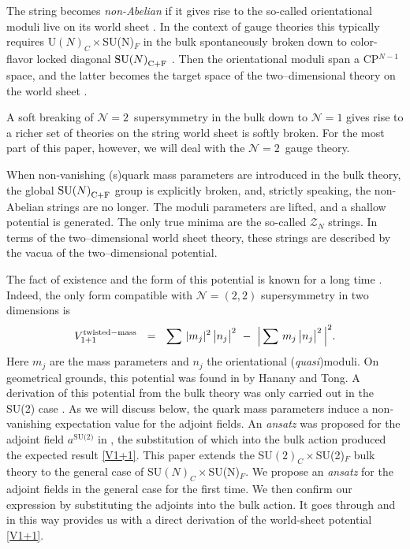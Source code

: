 \documentclass[12pt]{article}
\def\beq{\begin{equation}}
\def\eeq{\end{equation}}
\newcommand{\ntwon}{${\mathcal N}=2$}
\newcommand{\ntwot}{${\mathcal N}= \left(2,2\right) $ }
\newcommand{\mc}[1]{\mathcal{#1}}
\def\cfl {$\text{SU($N$)}_{\rm C+F}$ }
\newcommand{\cpn}{CP$^{N-1}$\,}
\newcommand{\ansatz}{{\it ansatz} }
\begin{document}
	The string becomes {\it non-Abelian} if it gives rise to the so-called orientational moduli 	live on
	its world sheet \cite{HT1,ABEKY,SYmon,HT2}. In the context of gauge theories this typically requires U$(N)_C\times$SU(N)$_F$
	in the bulk
	spontaneously broken down to color-flavor locked  diagonal $\!$\cfl.
	Then the orientational moduli  span a \cpn space, and 
	the latter becomes the target space of the two--dimensional theory on the world sheet \cite{SYrev}.

	A soft breaking of   \ntwon\, supersymmetry in the bulk down to
	${\mathcal N}=1$ gives rise to a richer  set of theories on the string world sheet
	is softly broken.
	For the most part of this paper, however, we will deal with the \ntwon\, gauge theory.

	When non-vanishing (s)quark mass parameters are introduced in  the bulk theory, 
	the global \cfl group is explicitly broken, and, strictly speaking,
	the non-Abelian strings are no longer.
	The moduli parameters are lifted, and a shallow potential is generated. The only true minima  are the so-called $ \mc{Z}_N $ strings.
	In terms of the two--dimensional world sheet theory, these strings are described by
	the vacua of the two--dimensional potential.

	The fact of existence and the form of this potential is known for a long time 
\cite{HT2,Shifman:2006bs}.
	Indeed, the only form compatible with \ntwot supersymmetry in two dimensions is
\beq
\label{V1+1}
	V_{1+1}^{\rm twisted-mass}    ~~=~~    \sum\, | m_j |^2\, \big| n_j \big|^2   ~-~  \Big| \sum\, m_j\, \big| n_j \big|^2 \,\Big|^2.
\eeq
	Here $ m_j $ are the mass parameters and $ n_j $ the orientational ({\it quasi})moduli.
	On geometrical grounds, this potential was found in \cite{HT2} by Hanany and Tong. 
	A derivation of this potential from the bulk theory was only carried out in the SU(2) case \cite{SYmon}.
	As we will discuss below, the quark mass parameters induce a non-vanishing expectation value for the adjoint fields.
	An \ansatz was proposed for the adjoint field $ a^\text{SU(2)} $ in \cite{SYmon},
	the substitution of which into the bulk action produced the expected result \eqref{V1+1}.
	This paper extends the SU$(2)_C\times$SU(2)$_F$ bulk theory to the general case of SU$(N)_C\times$SU(N)$_F$.
We propose an \ansatz for the adjoint fields in the general case  for the first time.
	We then confirm our expression by substituting the adjoints  into the bulk action. It goes through and in this way  provides us with a direct
	derivation of the world-sheet potential \eqref{V1+1}.
\end{document}
